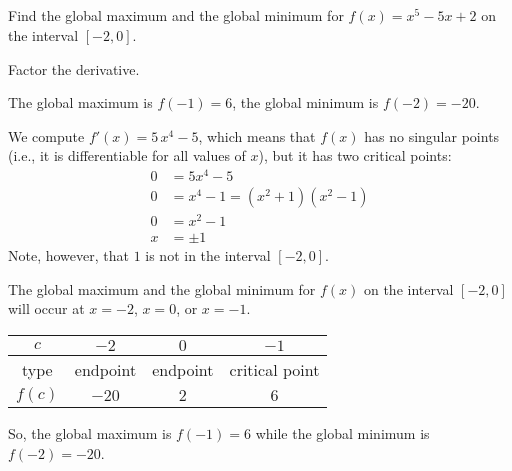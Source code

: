%
%
\subsection*{\Procedural}

\begin{question}[2015Q]\label{s3.5.3given1}
Find the global maximum and the global minimum for $f(x)=x^5 - 5x + 2$ on the interval $[-2,0]$.
\end{question}
\begin{hint}
Factor the derivative.
\end{hint}
\begin{answer}
The global maximum is $f(-1) = 6$, the global minimum is $f(-2) = -20$.
\end{answer}
\begin{solution}
We compute $f'(x)=5\,x^4 - 5$, which means that $f(x)$ has no singular points (i.e., it is
differentiable for all values of $x$), but it has two critical points:
\begin{align*}
0&=5x^4-5\\
0&=x^4-1=(x^2+1)(x^2-1)\\
0&=x^2-1\\
x&= \pm 1
\end{align*}
Note, however, that $1$ is not in the interval $[-2,0]$.

The global maximum and the
global minimum for $f(x)$ on the interval $[-2,0]$ will occur at $x=-2$, $x=0$, or $x=-1$.
\begin{center}
\begin{tabular}{|c||c|c|c|}
\hline
$c$ & $-2$ &  $0$ &  $-1$  \\
\hline
type & endpoint & endpoint & critical point  \\
\hline
$f(c)$ & $-20$ & $2$ & $6$ \\
\hline
\end{tabular}
\end{center}

So, the global maximum is $f(-1) = 6$ while the global minimum is $f(-2) = -20$.
\end{solution}



